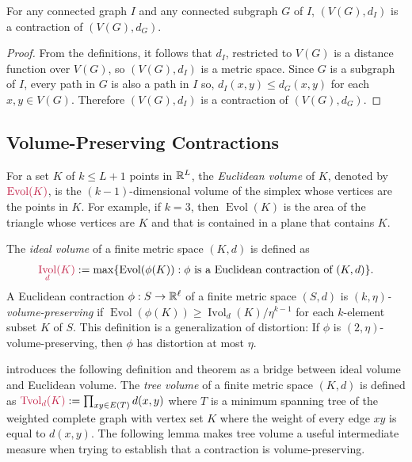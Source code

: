 \documentclass{patmorin}
\makeatletter
\renewcommand{\ge}{\geqslant}
\renewcommand{\le}{\leqslant}
\newcommand{\defin}[1]{\emph{\textcolor{brightmaroon}{#1}}}
\def\mathcolor#1#{\@mathcolor{#1}}
\def\@mathcolor#1#2#3{%
  \protect\leavevmode
  \begingroup
    \color#1{#2}#3%
  \endgroup
}
\newcommand{\mathdefin}[1]{\mathcolor{brightmaroon}{#1}}
\DeclareMathOperator{\evol}{Evol}
\DeclareMathOperator{\ivol}{Ivol}
\DeclareMathOperator{\tvol}{Tvol}
\makeatother
\begin{document}
\begin{obs}\label{supergraph_contraction}
  For any connected graph $I$ and any connected subgraph $G$ of $I$, $(V(G),d_I)$ is a contraction of $(V(G),d_G)$.
\end{obs}

\begin{proof}
  From the definitions, it follows that $d_I$, restricted to $V(G)$ is a distance function over $V(G)$, so $(V(G),d_I)$ is a metric space.  Since $G$ is a subgraph of $I$, every path in $G$ is also a path in $I$ so, $d_I(x,y)\le d_G(x,y)$ for each $x,y\in V(G)$.  Therefore $(V(G),d_I)$ is a contraction of $(V(G),d_G)$.
\end{proof}



\subsection{Volume-Preserving Contractions}
\label{contractions_section}

For a set $K$ of $k\le L+1$ points in $\mathbb{R}^L$, the \defin{Euclidean volume} of $K$, denoted by $\mathdefin{\evol(K)}$, is the $(k-1)$-dimensional volume of the simplex whose vertices are the points in $K$.  For example, if $k=3$, then $\evol(K)$ is the area of the triangle whose vertices are $K$ and that is contained in a plane that contains $K$.

The \defin{ideal volume} of a finite metric space $(K,d)$ is defined as $$\mathdefin{\ivol_d(K)}:=\max\{\evol(\phi(K)):\text{$\phi$ is a Euclidean contraction of $(K,d)$}\}.$$  A Euclidean contraction $\phi:S\to\mathbb{R}^{\ell}$ of a finite metric space $(S,d)$ is \defin{$(k,\eta)$-volume-preserving} if $\evol(\phi(K))\ge \ivol_d(K)/\eta^{k-1}$ for each $k$-element subset $K$ of $S$.  This definition is a generalization of distortion: If $\phi$ is $(2,\eta)$-volume-preserving, then $\phi$ has distortion at most $\eta$.

\citet{feige:approximating} introduces the following definition and theorem as a bridge between ideal volume and Euclidean volume. The \defin{tree volume} of a finite metric space $(K,d)$ is defined as $\mathdefin{\tvol_d(K)}:=\prod_{xy\in E(T)} d(x,y)$ where $T$ is a minimum spanning tree of the weighted complete graph with vertex set $K$ where the weight of every edge $xy$ is equal to $d(x,y)$.  The following lemma makes tree volume a useful intermediate measure when trying to establish that a contraction is volume-preserving.
\end{document}
